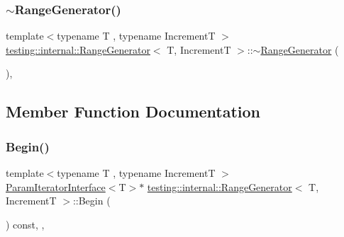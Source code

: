 \mbox{\label{classtesting_1_1internal_1_1RangeGenerator_a72f6e6f65f1dd3f86672f6ed47df74ef}} 
\subsubsection{\texorpdfstring{$\sim$\+Range\+Generator()}{~RangeGenerator()}}
{\footnotesize\ttfamily template$<$typename T , typename IncrementT $>$ \\
\hyperlink{classtesting_1_1internal_1_1RangeGenerator}{testing\+::internal\+::\+Range\+Generator}$<$ T, IncrementT $>$\+::$\sim$\hyperlink{classtesting_1_1internal_1_1RangeGenerator}{Range\+Generator} (\begin{DoxyParamCaption}{ }\end{DoxyParamCaption})\hspace{0.3cm}{\ttfamily [inline]}, {\ttfamily [override]}}



\subsection{Member Function Documentation}
\mbox{\label{classtesting_1_1internal_1_1RangeGenerator_a502913fbcf14e89d5765dfb44f3c1295}} 
\subsubsection{\texorpdfstring{Begin()}{Begin()}}
{\footnotesize\ttfamily template$<$typename T , typename IncrementT $>$ \\
\hyperlink{classtesting_1_1internal_1_1ParamIteratorInterface}{Param\+Iterator\+Interface}$<$T$>$$\ast$ \hyperlink{classtesting_1_1internal_1_1RangeGenerator}{testing\+::internal\+::\+Range\+Generator}$<$ T, IncrementT $>$\+::Begin (\begin{DoxyParamCaption}{ }\end{DoxyParamCaption}) const\hspace{0.3cm}{\ttfamily [inline]}, {\ttfamily [override]}, {\ttfamily [virtual]}}



